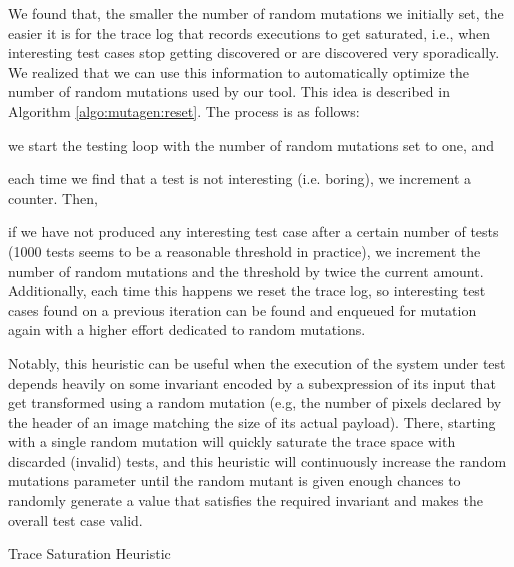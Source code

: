 \documentclass[sigconf,review,anonymous]{acmart}
\begin{document}
We found that, the smaller the number of random mutations we initially set, the
easier it is for the trace log that records executions to get saturated, i.e.,
when interesting test cases stop getting discovered or are discovered very
sporadically.
%
We realized that we can use this information to automatically optimize the
number of random mutations used by our tool.
%
This idea is described in Algorithm \ref{algo:mutagen:reset}.
%
The process is as follows:
%
\begin{inparaenum}
  \item we start the testing loop with the number of random mutations set to
    one, and
  \item each time we find that a test is not interesting (i.e. boring), we
    increment a counter.
  Then,
  \item if we have not produced any interesting test case after a certain number
    of tests (1000 tests seems to be a reasonable threshold in practice), we
    increment the number of random mutations and the threshold by twice the
    current amount.
    Additionally, each time this happens we reset the trace log, so interesting
    test cases found on a previous iteration can be found and enqueued for
    mutation again with a higher effort dedicated to random mutations.
\end{inparaenum}

Notably, this heuristic can be useful when the execution of the system under
test depends heavily on some invariant encoded by a subexpression of its input
that get transformed using a random mutation (e.g, the number of pixels declared
by the header of an image matching the size of its actual payload).
%
There, starting with a single random mutation will quickly saturate the trace
space with discarded (invalid) tests, and this heuristic will continuously
increase the random mutations parameter until the random mutant is given enough
chances to randomly generate a value that satisfies the required invariant and
makes the overall test case valid.

\begin{algorithm}[t]
  \SetAlgoLined
  \DontPrintSemicolon

\caption{\label{algo:mutagen:reset}Trace Saturation Heuristic}
\end{algorithm}
\end{document}
